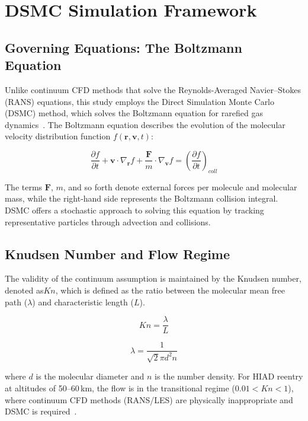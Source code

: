 \section{DSMC Simulation Framework}

\subsection{Governing Equations: The Boltzmann Equation}
Unlike continuum CFD methods that solve the Reynolds-Averaged Navier--Stokes (RANS) equations, this study employs the Direct Simulation Monte Carlo (DSMC) method, which solves the Boltzmann equation for rarefied gas dynamics~\cite{bird1994molecular}. The Boltzmann equation describes the evolution of the molecular velocity distribution function $f(\mathbf{r}, \mathbf{v}, t)$:

\begin{equation}
    \frac{\partial f}{\partial t} + \mathbf{v} \cdot \nabla_{\mathbf{r}} f + \frac{\mathbf{F}}{m} \cdot \nabla_{\mathbf{v}} f = \left(\frac{\partial f}{\partial t}\right)_{coll}
\end{equation}

The terms $\mathbf{F}$, $m$, and so forth denote external forces per molecule and molecular mass, while the right-hand side represents the Boltzmann collision integral. DSMC offers a stochastic approach to solving this equation by tracking representative particles through advection and collisions.

\subsection{Knudsen Number and Flow Regime}
The validity of the continuum assumption is maintained by the Knudsen number, denoted as$Kn$, which is defined as the ratio between the molecular mean free path ($\lambda$) and characteristic length ($L$).

\begin{equation}
    Kn = \frac{\lambda}{L}
\end{equation}

\begin{equation}
    \lambda = \frac{1}{\sqrt{2} \pi d^2 n}
\end{equation}

where $d$ is the molecular diameter and $n$ is the number density. For HIAD reentry at altitudes of 50--60\,km, the flow is in the transitional regime ($0.01 < Kn < 1$), where continuum CFD methods (RANS/LES) are physically inappropriate and DSMC is required~\cite{bird1994molecular}.


